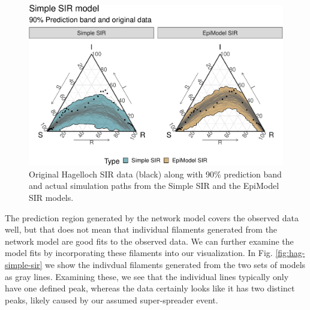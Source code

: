 \documentclass[
  shortnames]{jss}
\begin{document}
\begin{CodeChunk}
\begin{figure}[H]

{\centering \includegraphics{Figs/unnamed-chunk-12-1} 

}

\caption{\label{fig:hag-simple-sir}  Original Hagelloch SIR data (black) along with 90\% prediction band and actual simulation paths from the Simple SIR and the EpiModel SIR models.}\label{fig:unnamed-chunk-12}
\end{figure}
\end{CodeChunk}

The prediction region generated by the network model covers the observed
data well, but that does not mean that individual filaments generated
from the network model are good fits to the observed data. We can
further examine the model fits by incorporating these filaments into our
visualization. In Fig. \ref{fig:hag-simple-sir} we show the indivdual
filaments generated from the two sets of models as gray lines. Examining
these, we see that the individual lines typically only have one defined
peak, whereas the data certainly looks like it has two distinct peaks,
likely caused by our assumed super-spreader event.
\end{document}

